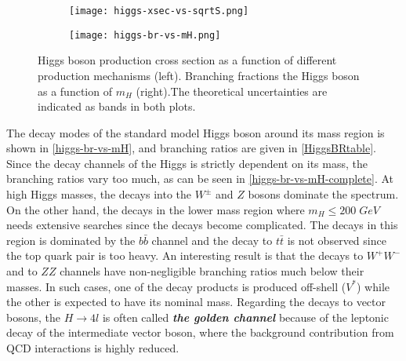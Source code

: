 \begin{figure*}[ht]
        \centering
        \begin{subfigure}[b]{0.475\textwidth}
            \centering
            \texttt{[image: higgs-xsec-vs-sqrtS.png]}
            \vspace{-0.75cm}
            \label{higgs-xsec-vs-sqrtS}
        \end{subfigure}
        \hspace{0.2cm}
        \begin{subfigure}[b]{0.475\textwidth}  
            \centering 
            \texttt{[image: higgs-br-vs-mH.png]}
            \vspace{-0.75cm}
            \label{higgs-br-vs-mH}
        \end{subfigure}
        \caption[Higgs boson production cross section as a function of different production mechanisms (left). Branching fractions the Higgs boson as a function of $m_H$ .The theoretical uncertainties are indicated as bands in both plots.]
        {\small Higgs boson production cross section as a function of different production mechanisms (left)\cite{higg-phen-3}. Branching fractions the Higgs boson as a function of $m_H$ (right)\cite{higgs-br-vs-mH}.The theoretical uncertainties are indicated as bands in both plots.}
\end{figure*}

The decay modes of the standard model Higgs boson around its mass region is shown in \autoref{higgs-br-vs-mH}, and branching ratios are given in \autoref{HiggsBRtable}. Since the decay channels of the Higgs is strictly dependent on its mass, the branching ratios vary too much, as can be seen in \autoref{higgs-br-vs-mH-complete}. At high Higgs masses, the decays into the $W^\pm$ and $Z$ bosons dominate the spectrum.  On the other hand, the decays in the lower mass region where $m_H \le 200\; GeV$ needs extensive searches since the decays become complicated. The decays in this region is dominated by the $b\bar b$ channel and the decay to $t\bar t$ is not observed since the top quark pair is too heavy. An interesting result is that the decays to $W^+W^-$ and to $ZZ$ channels have non-negligible branching ratios much below their masses. In such cases, one of the decay products is produced off-shell ($V^*$) while the other is expected to have its nominal mass. Regarding the decays to vector bosons, the $H\rightarrow 4l$ is often called \emph{\textbf{the golden channel}} because of the leptonic decay of the intermediate vector boson, where the background contribution from QCD interactions is highly reduced.

